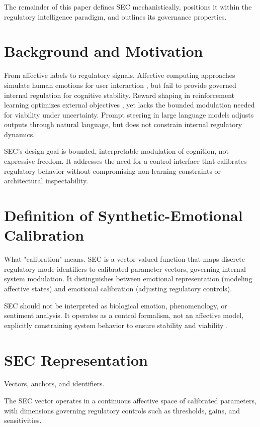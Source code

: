 \documentclass[12pt,a4paper]{article}
\begin{document}
The remainder of this paper defines SEC mechanistically, positions it within the regulatory intelligence paradigm, and outlines its governance properties.

\section{Background and Motivation}

From affective labels to regulatory signals. Affective computing approaches simulate human emotions for user interaction \cite{Picard2000}, but fail to provide governed internal regulation for cognitive stability. Reward shaping in reinforcement learning optimizes external objectives \cite{Sutton2018}, yet lacks the bounded modulation needed for viability under uncertainty. Prompt steering in large language models adjusts outputs through natural language, but does not constrain internal regulatory dynamics.

SEC's design goal is bounded, interpretable modulation of cognition, not expressive freedom. It addresses the need for a control interface that calibrates regulatory behavior without compromising non-learning constraints or architectural inspectability.

\section{Definition of Synthetic-Emotional Calibration}

What "calibration" means. SEC is a vector-valued function that maps discrete regulatory mode identifiers to calibrated parameter vectors, governing internal system modulation. It distinguishes between emotional representation (modeling affective states) and emotional calibration (adjusting regulatory controls).

SEC should not be interpreted as biological emotion, phenomenology, or sentiment analysis. It operates as a control formalism, not an affective model, explicitly constraining system behavior to ensure stability and viability \cite{Ashby1956,Aubin2009}.

\section{SEC Representation}

Vectors, anchors, and identifiers.

The SEC vector operates in a continuous affective space of calibrated parameters, with dimensions governing regulatory controls such as thresholds, gains, and sensitivities.
\end{document}
